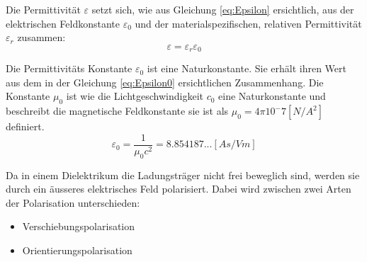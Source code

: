 Die Permittivität $\varepsilon$ setzt sich, wie aus Gleichung \ref{eq:Epsilon} ersichtlich, aus der elektrischen Feldkonstante $\varepsilon_0$ und der materialspezifischen, relativen Permittivität $\varepsilon_r$ zusammen:
\begin{equation}\label{eq:Epsilon}
\varepsilon = \varepsilon_r \varepsilon_0
\end{equation}

Die Permittivitäts Konstante $\varepsilon_{0}$ ist eine Naturkonstante. Sie erhält ihren Wert aus dem in der Gleichung \ref{eq:Epsilon0} ersichtlichen Zusammenhang. Die Konstante $\mu_{0}  $ ist wie die Lichtgeschwindigkeit $c_0$ eine Naturkonstante und beschreibt die magnetische Feldkonstante sie ist als  $\mu_{0}=4\pi10^-7 [N/A^{2}]$ definiert\cite{WikiPermitt}.
\begin{equation}\label{eq:Epsilon0}
\varepsilon_{0} = \dfrac{1}{\mu_{0}c^{2}}=8.854187...[As/Vm]
\end{equation}


Da in einem Dielektrikum die Ladungsträger nicht frei beweglich sind, werden sie durch ein äusseres elektrisches Feld polarisiert. Dabei wird zwischen zwei Arten der Polarisation unterschieden:
\begin{itemize}
\item Verschiebungspolarisation
\item Orientierungspolarisation
\end{itemize}

